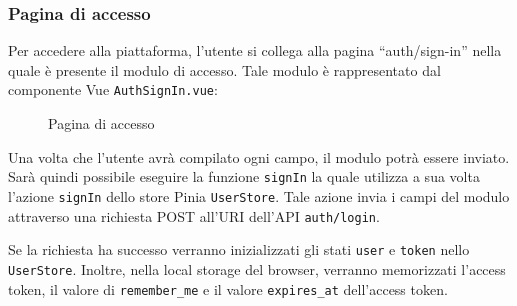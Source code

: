 \subsubsection{Pagina di accesso}
Per accedere alla piattaforma, l'utente si collega alla pagina ``auth/sign-in'' nella quale \`e presente il modulo di accesso. Tale modulo \`e rappresentato dal componente Vue \verb|AuthSignIn.vue|:

\begin{figure}[htbp]
	\centering
	\fboxsep=0.5pt
	\fboxrule=0.5pt
	\caption{Pagina di accesso}
	\label{fig:sign_in_page}
\end{figure}

Una volta che l'utente avr\`a compilato ogni campo, il modulo potr\`a essere inviato. Sar\`a quindi possibile eseguire la funzione \verb|signIn| la quale utilizza a sua volta l'azione \verb|signIn| dello store Pinia \verb|UserStore|. Tale azione invia i campi del modulo attraverso una richiesta POST all'URI dell'API \verb|auth/login|.

Se la richiesta ha successo verranno inizializzati gli stati \verb|user| e \verb|token| nello \verb|UserStore|. Inoltre, nella local storage del browser, verranno memorizzati l'access token, il valore di \verb|remember_me| e  il valore \verb|expires_at| dell'access token.

